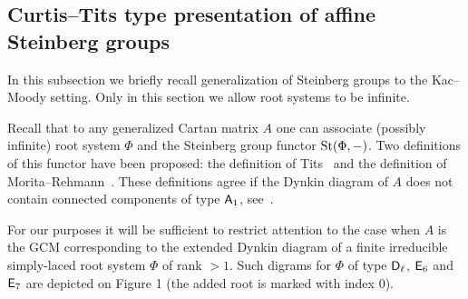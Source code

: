 \subsection{Curtis--Tits type presentation of affine Steinberg groups} \label{subsec:curtis-tits}
In this subsection we briefly recall generalization of Steinberg groups to the Kac--Moody setting.
Only in this section we allow root systems to be infinite.

Recall that to any generalized Cartan matrix $A$ one can associate (possibly infinite) root system $\Phi$ and the Steinberg group functor $\operatorname{St}(\Phi, -)$.
Two definitions of this functor have been proposed: the definition of Tits~\cite[\S~3.6]{Ti87} and the definition of Morita--Rehmann~\cite[\S~2]{MR90}.
These definitions agree if the Dynkin diagram of $A$ does not contain connected components of type $\mathsf{A}_1$, see~\cite[\S~6]{A13}.

For our purposes it will be sufficient to restrict attention to the case when $A$ is the GCM corresponding to the extended Dynkin diagram of a finite irreducible simply-laced root system $\Phi$ of rank $>1$.
Such digrams for $\Phi$ of type $\mathsf{D}_\ell$, $\mathsf{E}_6$ and $\mathsf{E}_7$ are depicted on Figure 1 (the added root is marked with index $0$).


